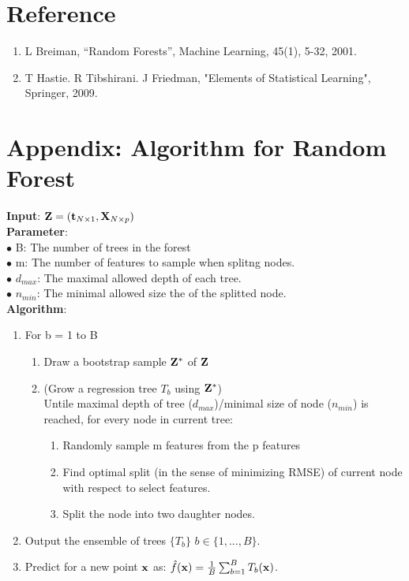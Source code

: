 \documentclass[11pt]{article}
\theoremstyle{definition}
\begin{document}
\clearpage
\section*{\textbf{Reference}}
\begin{enumerate}
\item L Breiman, “Random Forests”, Machine Learning, 45(1), 5-32, 2001. 
\item T Hastie. R Tibshirani. J Friedman, "Elements of Statistical Learning", Springer, 2009.
\end{enumerate}


\section*{\textbf{Appendix: Algorithm for Random Forest}}
\textbf{Input}: ${\bf Z} = ({\bf t}_{N \times 1}, {\bf X}_{N \times p})$\\

\textbf{Parameter}:\\
$\bullet$ B: The number of trees in the forest\\
$\bullet$ m: The number of features to sample when splitng nodes.\\
$\bullet$ $d_{max}$: The maximal allowed depth of each tree. \\
$\bullet$ $n_{min}$: The minimal allowed size the of the splitted node.\\

\textbf{Algorithm}:
\begin{enumerate}
\item For b = 1 to B
	\begin{enumerate}
	\item Draw a bootstrap sample ${\bf Z}^*$ of ${\bf Z}$
	\item (Grow a regression tree $T_b$ using ${\bf Z}^*$)\\
	Untile maximal depth of tree ($d_{max}$)/minimal size of node ($n_{min}$) is reached, for every node in current tree:
	\begin{enumerate}
		\item Randomly sample m features from the p features
		\item Find optimal split (in the sense of minimizing RMSE) of current node with respect to select features.
		\item Split the node into two daughter nodes.
	\end{enumerate}
	\end{enumerate}
\item Output the ensemble of trees $\{T_b\}$ $b \in \{1, ..., B\}$.
\item Predict for a new point ${\bf x}$ as: 
$\hat{f}({\bf x}) = \frac{1}{B} \sum_{b=1}^B T_b({\bf x})$.
\end{enumerate}
\end{document}
